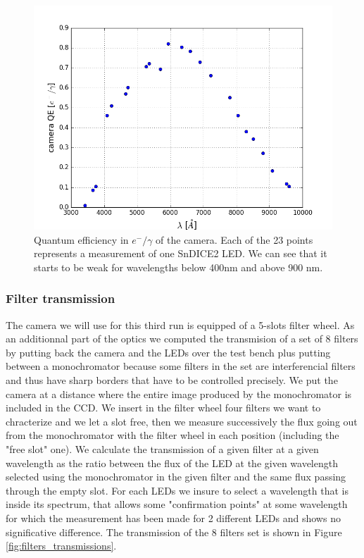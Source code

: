 \documentclass[\docopts]{\docclass}
\begin{document}
\begin{figure}[ht]
  \centering
  \includegraphics[width=0.7\linewidth]{camera_qe.png}
  \caption{Quantum efficiency in $e^-/\gamma$ of the camera. Each of
    the 23 points represents a measurement of one SnDICE2 LED. We can
    see that it starts to be weak for wavelengths below 400nm and
    above 900 nm.}
  \label{fig:camera_qe}
\end{figure}


\subsubsection{Filter transmission}
\label{sec:filters}
The camera we will use for this third run is equipped of a 5-slots
filter wheel. As an additionnal part of the optics we computed the
transmision of a set of 8 filters by putting back the camera and the
LEDs over the test bench plus putting between a monochromator because
some filters in the set are interferencial filters and thus have sharp
borders that have to be controlled precisely. We put the camera at a
distance where the entire image produced by the monochromator is
included in the CCD. We insert in the filter wheel four filters we
want to chracterize and we let a slot free, then we measure
successively the flux going out from the monochromator with the filter
wheel in each position (including the "free slot" one). We calculate
the transmission of a given filter at a given wavelength as the ratio
between the flux of the LED at the given wavelength selected using the
monochromator in the given filter and the same flux passing through
the empty slot. For each LEDs we insure to select a wavelength that is
inside its spectrum, that allows some "confirmation points" at some
wavelength for which the measurement has been made for 2 different
LEDs and shows no significative difference. The transmission of the 8
filters set is shown in Figure \ref{fig:filters_transmissions}.
\end{document}
